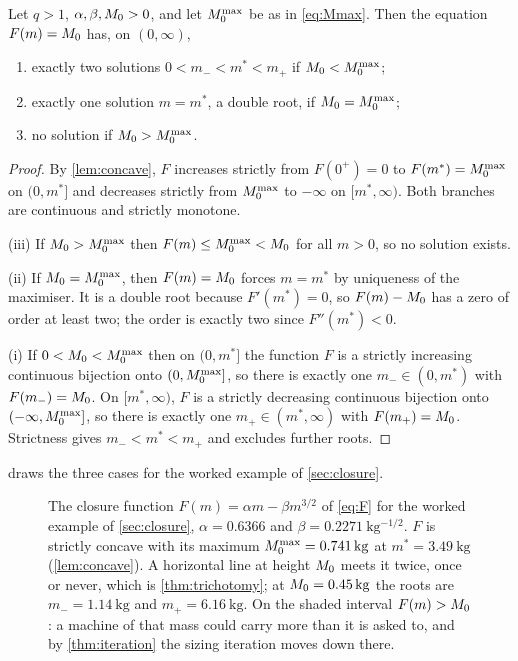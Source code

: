 \begin{theorem}
\label{thm:trichotomy}
Let $q>1$, $\alpha,\beta,M_0>0$, and let $M_0^{\max}$ be as in \cref{eq:Mmax}.
Then the equation $F(m)=M_0$ has, on $(0,\infty)$,
\begin{enumerate}[label=(\roman*),nosep]
  \item exactly two solutions $0 < m_- < m^* < m_+$ if $M_0 < M_0^{\max}$;
  \item exactly one solution $m = m^*$, a double root, if $M_0 = M_0^{\max}$;
  \item no solution if $M_0 > M_0^{\max}$.
\end{enumerate}
\end{theorem}

\begin{proof}
By \cref{lem:concave}, $F$ increases strictly from $F(0^+)=0$ to $F(m^*)=M_0^{\max}$
on $(0,m^*]$ and decreases strictly from $M_0^{\max}$ to $-\infty$ on
$[m^*,\infty)$. Both branches are continuous and strictly monotone.

(iii) If $M_0>M_0^{\max}$ then $F(m)\le M_0^{\max} < M_0$ for all $m>0$, so no
solution exists.

(ii) If $M_0=M_0^{\max}$, then $F(m)=M_0$ forces $m=m^*$ by uniqueness of the
maximiser. It is a double root because $F'(m^*)=0$, so $F(m)-M_0$ has a zero
of order at least two; the order is exactly two since $F''(m^*)<0$.

(i) If $0<M_0<M_0^{\max}$ then on $(0,m^*]$ the function $F$ is a strictly
increasing continuous bijection onto $(0,M_0^{\max}]$, so there is exactly one
$m_-\in(0,m^*)$ with $F(m_-)=M_0$. On $[m^*,\infty)$, $F$ is a strictly
decreasing continuous bijection onto $(-\infty,M_0^{\max}]$, so there is exactly one
$m_+\in(m^*,\infty)$ with $F(m_+)=M_0$. Strictness gives $m_-<m^*<m_+$ and
excludes further roots.
\end{proof}

 draws the three cases for the worked example of
\cref{sec:closure}.

\begin{figure}[tbp]
\centering

\caption{The closure function $F(m)=\alpha m-\beta m^{3/2}$ of \cref{eq:F} for
the worked example of \cref{sec:closure}, $\alpha=0.6366$ and
$\beta=\SI{0.2271}{\kilo\gram^{-1/2}}$. $F$ is strictly concave with its
maximum $M_0^{\max}=\SI{0.741}{\kilo\gram}$ at $m^*=\SI{3.49}{\kilo\gram}$
(\cref{lem:concave}). A horizontal line at height $M_0$ meets it twice, once
or never, which is \cref{thm:trichotomy}; at $M_0=\SI{0.45}{\kilo\gram}$ the
roots are $m_-=\SI{1.14}{\kilo\gram}$ and $m_+=\SI{6.16}{\kilo\gram}$. On the
shaded interval $F(m)>M_0$: a machine of that mass could carry more than it
is asked to, and by \cref{thm:iteration} the sizing iteration moves down there.}
\label{fig:trichotomy}
\end{figure}


